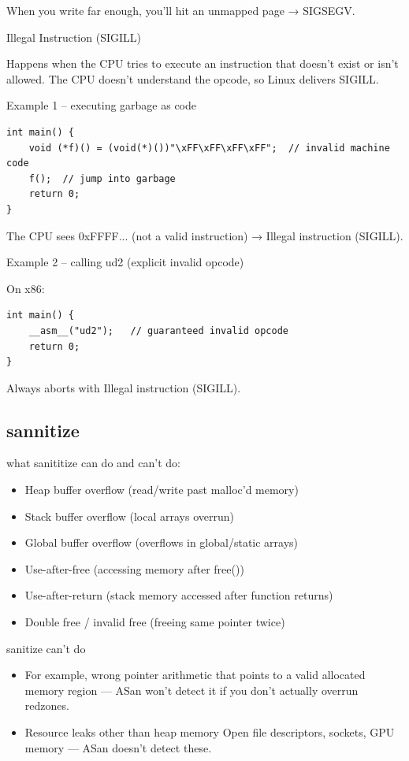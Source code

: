 \documentclass[paper=8.5in:11in, twoside, 12pt, pagesize=pdftex]{book}
\begin{document}
When you write far enough, you’ll hit an unmapped page → SIGSEGV.

Illegal Instruction (SIGILL)

Happens when the CPU tries to execute an instruction that doesn’t exist or isn’t allowed.
The CPU doesn’t understand the opcode, so Linux delivers SIGILL.

Example 1 – executing garbage as code
\begin{lstlisting}
int main() {
    void (*f)() = (void(*)())"\xFF\xFF\xFF\xFF";  // invalid machine code
    f();  // jump into garbage
    return 0;
}

\end{lstlisting}


The CPU sees 0xFFFF... (not a valid instruction) → Illegal instruction (SIGILL).

Example 2 – calling ud2 (explicit invalid opcode)

On x86:
\begin{lstlisting}
int main() {
    __asm__("ud2");   // guaranteed invalid opcode
    return 0;
}
\end{lstlisting}

Always aborts with Illegal instruction (SIGILL).

\subsection{sannitize}
what sanititize can do and can't do:
\begin{itemize}
\item Heap buffer overflow (read/write past malloc’d memory)

\item Stack buffer overflow (local arrays overrun)

\item Global buffer overflow (overflows in global/static arrays)

\item Use-after-free (accessing memory after free())

\item Use-after-return (stack memory accessed after function returns)

\item Double free / invalid free (freeing same pointer twice)

\end{itemize}

sanitize can't do
\begin{itemize}
\item For example, wrong pointer arithmetic that points to a valid allocated memory region — ASan won’t detect it if you don’t actually overrun redzones.

\item Resource leaks other than heap memory Open file descriptors, sockets, GPU memory — ASan doesn’t detect these.
\end{itemize}
\end{document}
